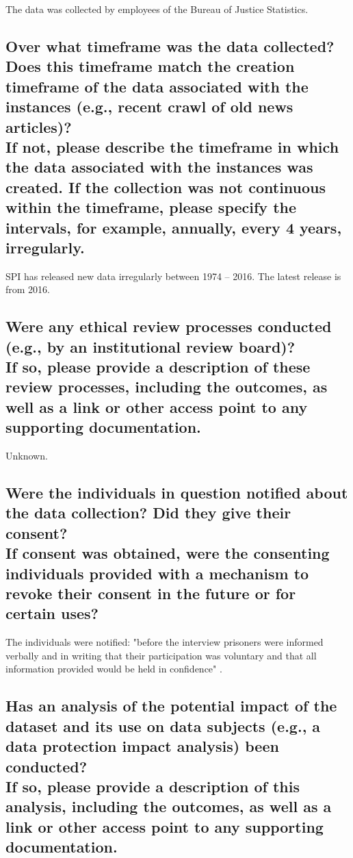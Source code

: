 \documentclass[letterpaper, 10 pt, conference]{ieeeconf}  %
\newcommand{\subtitle}[1]{{\\ \small \normalfont \color{purple} #1}}
\begin{document}
The data was collected by employees of the Bureau of Justice Statistics.

\subsection{Over what timeframe was the data collected? Does this timeframe match the creation timeframe of the data associated with the instances (e.g., recent crawl of old news articles)? \subtitle{If not, please describe the timeframe in which the data associated with the instances was created. If the collection was not continuous within the timeframe, please specify the intervals, for example, annually, every 4 years, irregularly.}}

SPI has released new data irregularly between 1974 -- 2016. The latest release is from 2016. 

\subsection{Were any ethical review processes conducted (e.g., by an institutional review board)? \subtitle{If so, please provide a description of these review processes, including the outcomes, as well as a link or other access point to any supporting documentation.}}

Unknown.

\subsection{Were the individuals in question notified about the data collection? Did they give their consent? \subtitle{If consent was obtained, were the consenting individuals provided with a mechanism to revoke their consent in the future or for certain uses?}}

The individuals were notified: "before the interview
prisoners were informed verbally and in writing that
their participation was voluntary and that all information
provided would be held in confidence" \cite{glaze2019methodology}.

\subsection{Has an analysis of the potential impact of the dataset and its use on data subjects (e.g., a data protection impact analysis) been conducted? \subtitle{If so, please provide a description of this analysis, including the outcomes, as well as a link or other access point to any supporting documentation.}}
\end{document}
